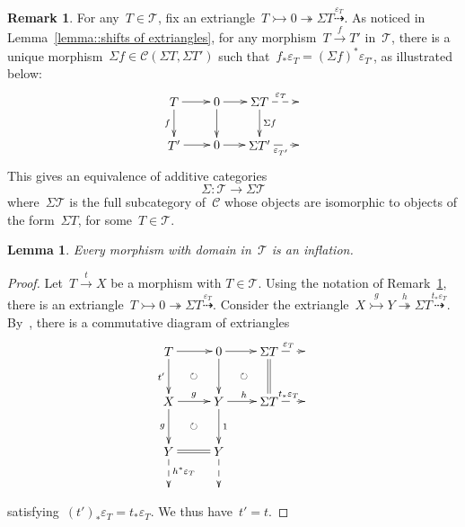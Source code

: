 \documentclass{amsart}
\newtheorem{lemma}[theorem]{Lemma}
\theoremstyle{definition}
\newtheorem{remark}[theorem]{Remark}
\newcommand{\cat}{\mathcal{C}}
\newcommand{\susp}{\Sigma}
\newcommand{\tc}{\mathcal{T}}
\newcommand{\infl}{\rightarrowtail}
\newcommand{\defl}{\twoheadrightarrow}
\newcommand{\eps}{\varepsilon}
\begin{document}
\begin{remark}
\label{remark::equivalence Sigma}
For any~$T\in\tc$, fix an extriangle~$T\infl 0\defl\susp T\overset{\eps_T}{\dashrightarrow}$.
As noticed in Lemma~\ref{lemma::shifts of extriangles}, for any morphism~$T\overset{f}{\to}T'$ in~$\tc$, there is a unique morphism~$\susp f\in\cat(\susp T,\susp T')$ such that~$f_\ast\eps_T=(\susp f)^\ast\eps_{T'}$, as illustrated below:
\[
\xy
(-12,6)*+{T}="0";
(0,6)*+{0}="2";
(12,6)*+{\susp T}="4";
(24,6)*+{}="6";
%
(-12,-6)*+{T'}="10";
(0,-6)*+{0}="12";
(12,-6)*+{\susp T'}="14";
(24,-6)*+{}="16";
%
{\ar "0";"2"};
{\ar "2";"4"};
{\ar@{-->}^{\eps_T} "4";"6"};
%
{\ar_{f} "0";"10"};
{\ar "2";"12"};
{\ar^{\susp f} "4";"14"};
%
{\ar "10";"12"};
{\ar "12";"14"};
{\ar@{-->}_{\eps_{T'}} "14";"16"};
\endxy
\]
This gives an equivalence of additive categories
\[
 \susp: \tc \to \susp\tc
\]
where~$\susp\tc$ is the full subcategory of~$\cat$ whose objects are isomorphic to objects of the form~$\susp T$, for some~$T\in\tc$.
\end{remark}

\begin{lemma}
\label{lemma:: mphs in T are inflations}
Every morphism with domain in~$\tc$ is an inflation.
\end{lemma}

\begin{proof}
Let~$T \overset{t}{\to} X$ be a morphism with $T\in \tc$.
Using the notation of Remark~\ref{remark::equivalence Sigma}, there is an extriangle~$T\infl 0\defl \susp T \overset{\eps_T}{\dashrightarrow}$.
Consider the extriangle~$X\overset{g}{\infl} Y \overset{h}{\defl} \susp T \overset{t_\ast\eps_T}{\dashrightarrow}$.
By~\cite[Proposition 3.17]{NakaokaPalu}, there is a commutative diagram of extriangles
\[
\xy
(-7,7)*+{T}="2";
(7,7)*+{0}="4";
(21,7)*+{\susp T}="6";
(32,7)*+{}="8";
%
(-7,-7)*+{X}="12";
(7,-7)*+{Y}="14";
(21,-7)*+{\susp T}="16";
(32,-7)*+{}="18";
%
(-7,-21)*+{Y}="22";
(7,-21)*+{Y}="24";
%
(-7,-32)*+{}="32";
(7,-32)*+{}="34";
%
{\ar@{->} "2";"4"};
{\ar@{->} "4";"6"};
{\ar@{-->}^{\eps_T} "6";"8"};
%
{\ar@{->}_{t'} "2";"12"};
{\ar "4";"14"};
{\ar@{=} "6";"16"};
%
{\ar^{g} "12";"14"};
{\ar^{h} "14";"16"};
{\ar@{-->}^{t_\ast\eps_T} "16";"18"};
%
{\ar_{g} "12";"22"};
{\ar^{1} "14";"24"};
%
{\ar@{=} "22";"24"};
%
{\ar@{-->}^{h^\ast\eps_T} "22";"32"};
{\ar@{-->} "24";"34"};
%
{\ar@{}|\circlearrowright "2";"14"};
{\ar@{}|\circlearrowright "4";"16"};
{\ar@{}|\circlearrowright "12";"24"};
\endxy
\]
satisfying~$(t')_\ast\eps_T=t_\ast\eps_T$.
We thus have~$t'=t$.
\end{proof}
\end{document}
